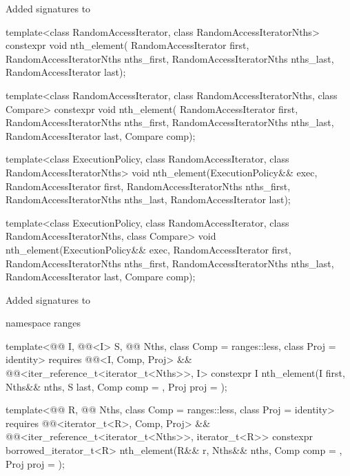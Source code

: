 Added signatures to 

\begin{codeblockAdd}
template<class RandomAccessIterator, class RandomAccessIteratorNths>
constexpr void nth_element( RandomAccessIterator first, 
RandomAccessIteratorNths nths_first, RandomAccessIteratorNths nths_last,
RandomAccessIterator last);

template<class RandomAccessIterator, class RandomAccessIteratorNths, class Compare>
constexpr void nth_element( RandomAccessIterator first, 
RandomAccessIteratorNths nths_first, RandomAccessIteratorNths nths_last,
RandomAccessIterator last, Compare comp);
\end{codeblockAdd}
\newpage
\begin{codeblockAdd}
template<class ExecutionPolicy, class RandomAccessIterator, class RandomAccessIteratorNths>
void nth_element(ExecutionPolicy&& exec, RandomAccessIterator first, 
RandomAccessIteratorNths nths_first, RandomAccessIteratorNths nths_last,
RandomAccessIterator last);

template<class ExecutionPolicy, class RandomAccessIterator,
class RandomAccessIteratorNths, class Compare>
void nth_element(ExecutionPolicy&& exec, RandomAccessIterator first, 
RandomAccessIteratorNths nths_first, RandomAccessIteratorNths nths_last,
RandomAccessIterator last, Compare comp);

\end{codeblockAdd}

Added signatures to 

\begin{codeblockAdd}
namespace ranges {
  template<@@ I, @@<I> S,
  @@ Nths, class Comp = ranges::less, class Proj = identity>
  requires @@<I, Comp, Proj>
  && @@<iter_reference_t<iterator_t<Nths>>, I>
  constexpr I nth_element(I first, Nths&& nths, S last, Comp comp = {}, Proj proj = {});

  template<@@ R,
  @@ Nths, class Comp = ranges::less, class Proj = identity>
  requires @@<iterator_t<R>, Comp, Proj>
  && @@<iter_reference_t<iterator_t<Nths>>, iterator_t<R>>
  constexpr borrowed_iterator_t<R> 
  nth_element(R&& r, Nths&& nths, Comp comp = {}, Proj proj = {}); 
}

\end{codeblockAdd}
%

